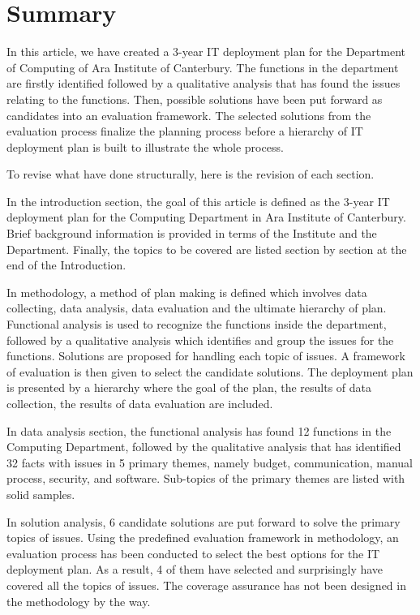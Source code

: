 
\section{Summary}

In this article, we have created a 3-year IT deployment plan for the Department of Computing of Ara Institute of Canterbury. The functions in the department are firstly identified followed by a qualitative analysis that has found the issues relating to the functions. Then, possible solutions have been put forward as candidates into an evaluation framework. The selected solutions from the evaluation process finalize the planning process before a hierarchy of IT deployment plan is built to illustrate the whole process.

To revise what have done structurally, here is the revision of each section.

In the introduction section, the goal of this article is defined as the 3-year IT deployment plan for the Computing Department in Ara Institute of Canterbury. Brief background information is provided in terms of the Institute and the Department. Finally, the topics to be covered are listed section by section at the end of the Introduction.

In methodology, a method of plan making is defined which involves data collecting, data analysis, data evaluation and the ultimate hierarchy of plan. Functional analysis is used to recognize the functions inside the department, followed by a qualitative analysis which identifies and group the issues for the functions. Solutions are proposed for handling each topic of issues. A framework of evaluation is then given to select the candidate solutions. The deployment plan is presented by a hierarchy where the goal of the plan, the results of data collection,  the results of data evaluation are included.

In data analysis section, the functional analysis has found 12 functions in the Computing Department, followed by the qualitative analysis that has identified 32 facts with issues in 5 primary themes, namely budget, communication, manual process, security, and software. Sub-topics of the primary themes are listed with solid samples.

In solution analysis, 6 candidate solutions are put forward to solve the primary topics of issues. Using the predefined evaluation framework in methodology, an evaluation process has been conducted to select the best options for the IT deployment plan. As a result, 4 of them have selected and surprisingly have covered all the topics of issues. The coverage assurance has not been designed in the methodology by the way.

